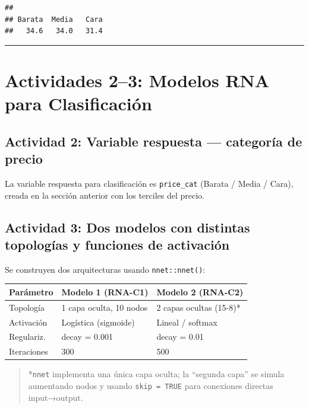 \documentclass[
]{article}
\begin{document}
\begin{verbatim}
## 
## Barata  Media   Cara 
##   34.6   34.0   31.4
\end{verbatim}

\begin{center}\rule{0.5\linewidth}{0.5pt}\end{center}

\section{Actividades 2--3: Modelos RNA para
Clasificación}\label{actividades-23-modelos-rna-para-clasificaciuxf3n}

\subsection{Actividad 2: Variable respuesta --- categoría de
precio}\label{actividad-2-variable-respuesta-categoruxeda-de-precio}

La variable respuesta para clasificación es \texttt{price\_cat} (Barata
/ Media / Cara), creada en la sección anterior con los terciles del
precio.

\subsection{Actividad 3: Dos modelos con distintas topologías y
funciones de
activación}\label{actividad-3-dos-modelos-con-distintas-topologuxedas-y-funciones-de-activaciuxf3n}

Se construyen dos arquitecturas usando \texttt{nnet::nnet()}:

\begin{longtable}[]{@{}lll@{}}
\toprule\noalign{}
Parámetro & Modelo 1 (RNA-C1) & Modelo 2 (RNA-C2) \\
\midrule\noalign{}
\endhead
\bottomrule\noalign{}
\endlastfoot
Topología & 1 capa oculta, 10 nodos & 2 capas ocultas (15-8)* \\
Activación & Logística (sigmoide) & Lineal / softmax \\
Regulariz. & decay = 0.001 & decay = 0.01 \\
Iteraciones & 300 & 500 \\
\end{longtable}

\begin{quote}
*\texttt{nnet} implementa una única capa oculta; la ``segunda capa'' se
simula aumentando nodos y usando \texttt{skip\ =\ TRUE} para conexiones
directas input→output.
\end{quote}
\end{document}
